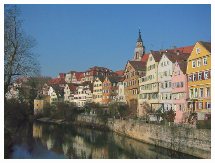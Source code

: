 \documentclass{article}
\begin{document}
\begin{figure}
\begin{minipage}{0.3\linewidth}
    \includegraphics[width=\textwidth]{img/content/block3_conv1}
    \end{minipage}

\medskip


\end{figure}
\end{document}

